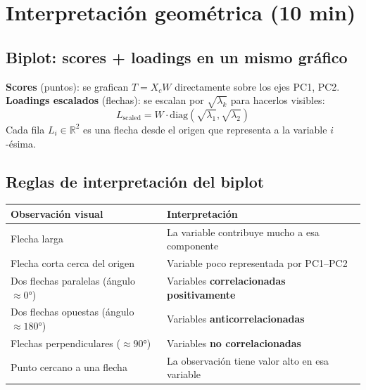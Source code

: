 \documentclass[11pt,a4paper]{article}
\newcommand{\R}{\mathbb{R}}
\begin{document}
\section{Interpretación geométrica (10 min)}

\subsection{Biplot: scores + loadings en un mismo gráfico}

\begin{formulabox}
\textbf{Scores} (puntos): se grafican $T = X_c W$ directamente sobre los ejes PC1, PC2.\\

\textbf{Loadings escalados} (flechas): se escalan por $\sqrt{\lambda_k}$ para hacerlos visibles:
\[
\boxed{\;L_{\text{scaled}} = W \cdot \mathrm{diag}(\sqrt{\lambda_1},\sqrt{\lambda_2})\;}
\]
Cada fila $L_i \in \R^2$ es una flecha desde el origen que representa a la variable $i$-ésima.
\end{formulabox}

\subsection{Reglas de interpretación del biplot}

\begin{center}
\begin{tabular}{@{}p{}p{}@{}}
\toprule
\textbf{Observación visual} & \textbf{Interpretación} \\
\midrule
Flecha larga & La variable contribuye mucho a esa componente \\
Flecha corta cerca del origen & Variable poco representada por PC1--PC2 \\
Dos flechas paralelas (ángulo $\approx 0°$) & Variables \textbf{correlacionadas positivamente} \\
Dos flechas opuestas (ángulo $\approx 180°$) & Variables \textbf{anticorrelacionadas} \\
Flechas perpendiculares ($\approx 90°$) & Variables \textbf{no correlacionadas} \\
Punto cercano a una flecha & La observación tiene valor alto en esa variable \\
\bottomrule
\end{tabular}
\end{center}
\end{document}

